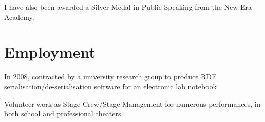 \documentclass[letterpaper]{article}
\renewenvironment{itemize}{
  \begin{list}{}{
    \setlength{\leftmargin}{1.5em}
  }
}{
  \end{list}
}
\begin{document}
I have also been awarded a Silver Medal in Public Speaking from the New Era Academy.

\section*{Employment}
\begin{itemize}
	\item In 2008, contracted by a university research group to produce RDF serialisation/de-serialisation software for an electronic lab notebook
	\item Volunteer work as Stage Crew/Stage Management for numerous performances, in both school and professional theaters.
\end{itemize}
\end{document}
